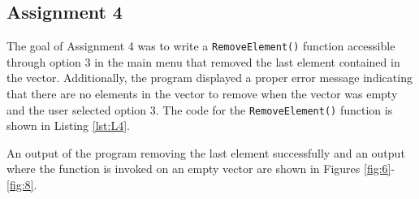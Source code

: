 \documentclass[
	letterpaper, %
	10pt, %
]{CSUniSchoolLabReport}
\begin{document}
  \subsection{Assignment 4} \hspace{.5 in} The goal of Assignment 4 was to write a \texttt{RemoveElement()} function accessible through option 3 in the main menu that removed the last element contained in the vector. Additionally, the program displayed a proper error message indicating that there are no elements in the vector to remove when the vector was empty and the user selected option 3. The code for the \texttt{RemoveElement()} function is shown in Listing \ref{lst:L4}. 



  An output of the program removing the last element successfully and an output where the function is invoked on an empty vector are shown in Figures \ref{fig:6}-\ref{fig:8}. 
\end{document}
